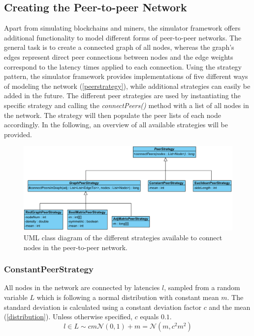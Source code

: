 \documentclass[a4paper,12pt,twoside]{report}
\begin{document}
\subsection{Creating the Peer-to-peer Network} \label{peerstratsection}
Apart from simulating blockchains and miners, the simulator framework offers additional functionality to model different forms of peer-to-peer networks. The general task is to create a connected graph of all nodes, whereas the graph's edges represent direct peer connections between nodes and the edge weights correspond to the latency times applied to each connection. Using the strategy pattern\cite{strategy}, the simulator framework provides implementations of five different ways of modeling the network (\autoref{peerstrategy}), while additional strategies can easily be added in the future. The different peer strategies are used by instantiating the specific strategy and calling the \textit{connectPeers()} method with a list of all nodes in the network. The strategy will then populate the peer lists of each node accordingly. In the following, an overview of all available strategies will be provided.
\begin{figure}[ht]
	\centering
  \includegraphics[width=\textwidth]{PeerStrategy.png}
	\caption{UML class diagram of the different strategies available to connect nodes in the peer-to-peer network.}
	\label{peerstrategy}
\end{figure}
\subsubsection{ConstantPeerStrategy}
All nodes in the network are connected by latencies $l$, sampled from a random variable $L$ which is following a normal distribution with constant mean $m$. The standard deviation is calculated using a constant deviation factor $c$ and the mean (\autoref{distribution}). Unless otherwise specified, $c$ equals $0.1$.
\begin{equation}\label{distribution} 
l\in L\sim cm\mathcal{N}(0,1)+m = \mathcal{N}(m,c^{2}m^{2})
\end{equation}
\end{document}
